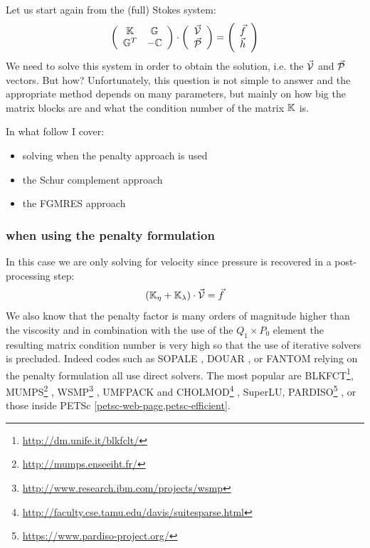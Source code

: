
Let us start again from the (full) Stokes system:
\begin{equation}
\left(
\begin{array}{cc}
{\mathbb{K}} & {\mathbb{G}} \\ {\mathbb{G}}^T & -{\mathbb{C}} 
\end{array}
\right)
\cdot
\left(
\begin{array}{c}
\vec{\cal V} \\ \vec{\cal P}
\end{array}
\right)
=
\left(
\begin{array}{c}
\vec{f} \\ \vec{h}
\end{array}
\right)
\label{StokesSyst}
\end{equation}
We need to solve this system in order to obtain the solution, i.e. the $\vec{\cal V}$ 
and $\vec{\cal P}$ vectors. But how? 
Unfortunately, this question is not simple to answer and the appropriate method depends on many 
parameters, but mainly on how big the matrix blocks are and what the condition number of the matrix ${\mathbb{K}}$ is. 

In what follow I cover:
\begin{itemize}
\item solving when the penalty approach is used
\item the Schur complement approach
\item the FGMRES approach
\end{itemize}

\Literature \cite{pasa75,mamo08,fumt11,knke04,kool00,kopo93} 

\subsubsection{when using the penalty formulation}

In this case we are only solving for 
velocity since pressure is recovered in a post-processing step:
\[
({\mathbb{K}}_\eta+{\mathbb{K}}_\lambda) \cdot \vec {\cal V} = \vec f
\]
 We also know that 
the penalty factor is many orders of magnitude higher than the viscosity and 
in combination with the use of the $Q_1 \times P_0$ element the resulting matrix 
condition number is very high so that the use of iterative solvers is precluded. 
Indeed codes such as SOPALE \cite{full95}, DOUAR \cite{brtf08}, or FANTOM \cite{thie11} 
relying on the penalty formulation all use direct solvers.
The most popular are BLKFCT\footnote{\url{http://dm.unife.it/blkfclt/}}, 
MUMPS\footnote{\url{http://mumps.enseeiht.fr/}}
\cite{amdu89,amdl00,amdk01,amgl06}, 
WSMP\footnote{\url{http://www.research.ibm.com/projects/wsmp}} \cite{GUPTA94ieee,GUPTA09sc-long},
UMFPACK and CHOLMOD\footnote{\url{http://faculty.cse.tamu.edu/davis/suitesparse.html}}
, SuperLU, PARDISO\footnote{\url{https://www.pardiso-project.org/}}
\cite{pardiso-6.0a,pardiso-6.0b,pardiso-6.0c}, or those inside PETSc
\ref{petsc-web-page,petsc-efficient}.

